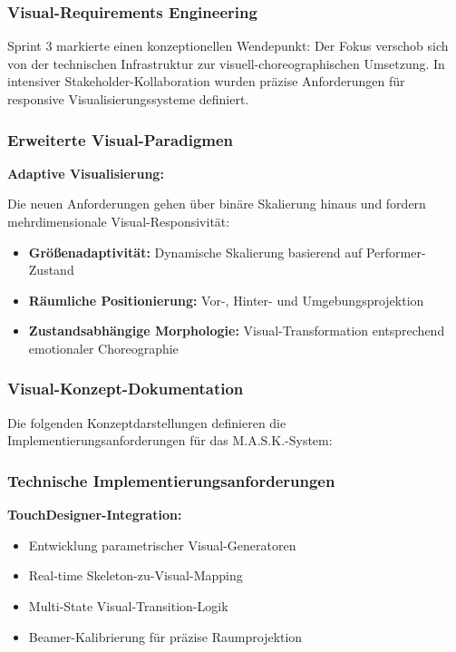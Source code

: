 \subsubsection{Visual-Requirements Engineering}

Sprint 3 markierte einen konzeptionellen Wendepunkt: Der Fokus verschob sich von der technischen Infrastruktur zur visuell-choreographischen Umsetzung. In intensiver Stakeholder-Kollaboration wurden präzise Anforderungen für responsive Visualisierungssysteme definiert.

\subsubsection{Erweiterte Visual-Paradigmen}

\textbf{Adaptive Visualisierung:}
\raggedright Die neuen Anforderungen gehen über binäre Skalierung hinaus und fordern mehrdimensionale Visual-Responsivität:
\begin{itemize}
    \item \textbf{Größenadaptivität:} Dynamische Skalierung basierend auf Performer-Zustand
    \item \textbf{Räumliche Positionierung:} Vor-, Hinter- und Umgebungsprojektion
    \item \textbf{Zustandsabhängige Morphologie:} Visual-Transformation entsprechend emotionaler Choreographie
\end{itemize}

\subsubsection{Visual-Konzept-Dokumentation}

Die folgenden Konzeptdarstellungen definieren die Implementierungsanforderungen für das M.A.S.K.-System:






\subsubsection{Technische Implementierungsanforderungen}

\textbf{TouchDesigner-Integration:}
\begin{itemize}
    \item Entwicklung parametrischer Visual-Generatoren
    \item Real-time Skeleton-zu-Visual-Mapping
    \item Multi-State Visual-Transition-Logik
    \item Beamer-Kalibrierung für präzise Raumprojektion
\end{itemize}

